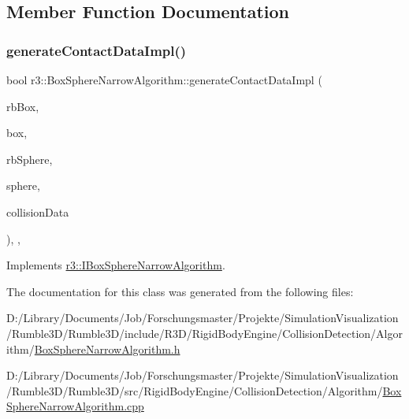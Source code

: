 \subsection{Member Function Documentation}
\mbox{\label{classr3_1_1_box_sphere_narrow_algorithm_a2fc345fdec27e85f0e569afa0d500865}} 
\subsubsection{\texorpdfstring{generate\+Contact\+Data\+Impl()}{generateContactDataImpl()}}
{\footnotesize\ttfamily bool r3\+::\+Box\+Sphere\+Narrow\+Algorithm\+::generate\+Contact\+Data\+Impl (\begin{DoxyParamCaption}\item[{\mbox{\hyperlink{classr3_1_1_rigid_body}{Rigid\+Body}} $\ast$}]{rb\+Box,  }\item[{\mbox{\hyperlink{classr3_1_1_collision_box}{Collision\+Box}} $\ast$}]{box,  }\item[{\mbox{\hyperlink{classr3_1_1_rigid_body}{Rigid\+Body}} $\ast$}]{rb\+Sphere,  }\item[{\mbox{\hyperlink{classr3_1_1_collision_sphere}{Collision\+Sphere}} $\ast$}]{sphere,  }\item[{\mbox{\hyperlink{classr3_1_1_collision_data}{Collision\+Data}} \&}]{collision\+Data }\end{DoxyParamCaption})\hspace{0.3cm}{\ttfamily [override]}, {\ttfamily [protected]}, {\ttfamily [virtual]}}



Implements \mbox{\hyperlink{classr3_1_1_i_box_sphere_narrow_algorithm_af28bcda3eb527a6ee48a3b624e5d47e0}{r3\+::\+I\+Box\+Sphere\+Narrow\+Algorithm}}.



The documentation for this class was generated from the following files\+:\begin{DoxyCompactItemize}
\item 
D\+:/\+Library/\+Documents/\+Job/\+Forschungsmaster/\+Projekte/\+Simulation\+Visualization/\+Rumble3\+D/\+Rumble3\+D/include/\+R3\+D/\+Rigid\+Body\+Engine/\+Collision\+Detection/\+Algorithm/\mbox{\hyperlink{_box_sphere_narrow_algorithm_8h}{Box\+Sphere\+Narrow\+Algorithm.\+h}}\item 
D\+:/\+Library/\+Documents/\+Job/\+Forschungsmaster/\+Projekte/\+Simulation\+Visualization/\+Rumble3\+D/\+Rumble3\+D/src/\+Rigid\+Body\+Engine/\+Collision\+Detection/\+Algorithm/\mbox{\hyperlink{_box_sphere_narrow_algorithm_8cpp}{Box\+Sphere\+Narrow\+Algorithm.\+cpp}}\end{DoxyCompactItemize}
